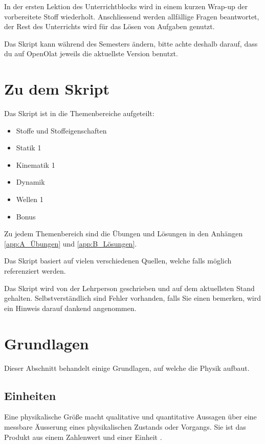 In der ersten Lektion des Unterrichtblocks wird in einem kurzen Wrap-up der vorbereitete Stoff wiederholt.
Anschliessend werden allfällige Fragen beantwortet, der Rest des Unterrichts wird für das Lösen von Aufgaben genutzt.

Das Skript kann während des Semesters ändern, bitte achte deshalb darauf, dass du auf
OpenOlat jeweils die aktuellste Version benutzt.

\section{Zu dem Skript}

Das Skript ist in die Themenbereiche aufgeteilt:

\begin{itemize}
    \item Stoffe und Stoffeigenschaften
    \item Statik 1
    \item Kinematik 1
    \item Dynamik
    \item Wellen 1
    \item Bonus
\end{itemize}

Zu jedem Themenbereich sind die Übungen und Lösungen in den Anhängen \ref{app:A_Übungen} und \ref{app:B_Lösungen}.

Das Skript basiert auf vielen verschiedenen Quellen, welche falls möglich referenziert werden.

Das Skript wird von der Lehrperson geschrieben und auf dem aktuellsten Stand gehalten.
Selbstverständlich sind Fehler vorhanden, falls Sie einen bemerken, wird ein Hinweis darauf
dankend angenommen.

\section{Grundlagen}

Dieser Abschnitt behandelt einige Grundlagen, auf welche die Physik aufbaut.

\subsection{Einheiten}

Eine physikalische Größe macht qualitative und quantitative Aussagen über eine messbare Äusserung 
eines physikalischen Zustands oder Vorgangs.
Sie ist das Produkt aus einem Zahlenwert und einer Einheit \cite{boge_physik_2008}.

